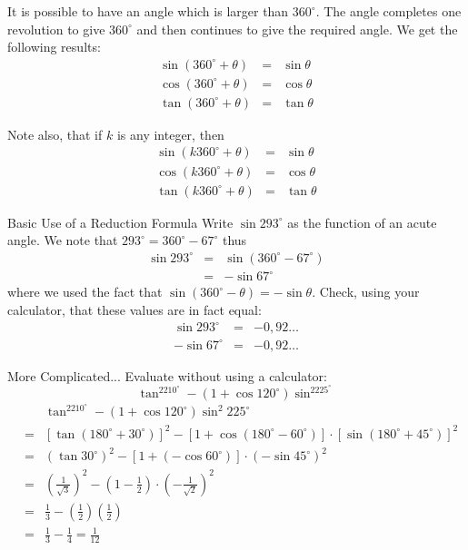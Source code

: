 It is possible to have an angle which is larger than $360^\circ$. The angle completes one revolution to give $360^\circ$ and then continues to give the required angle. We get the following results:
\begin{eqnarray*}
 \sin(360^\circ+\theta) &=& \sin\theta \\
 \cos(360^\circ+\theta) &=& \cos\theta \\
 \tan(360^\circ+\theta) &=& \tan\theta
\end{eqnarray*}

Note also, that if $k$ is any integer, then
\begin{eqnarray*}
 \sin(k360^\circ +\theta) &=& \sin\theta \\
 \cos(k360^\circ +\theta) &=& \cos\theta \\
 \tan(k360^\circ +\theta) &=& \tan\theta
\end{eqnarray*}

\begin{wex}{Basic Use of a Reduction Formula}
{%
Write $\sin 293^\circ$ as the function of an acute angle.
}%
{%
We note that $293^\circ = 360^\circ -67^\circ$ thus
\begin{eqnarray*}
 \sin 293^\circ & = & \sin (360^\circ - 67^\circ)\\
 & =& -\sin 67^\circ 
\end{eqnarray*}
where we used the fact that $ \sin (360^\circ -\theta) = -\sin\theta$. Check, using your calculator, that these values are in fact equal:
\begin{eqnarray*}
\sin 293^\circ &=& -0,92\ldots \\
-\sin 67^\circ &=& -0,92\ldots
\end{eqnarray*}
}%
\end{wex}

\begin{wex}{More Complicated...}
{%
Evaluate without using a calculator: 
\[\tan^2210^\circ-(1+\cos 120^\circ)\sin ^2225^\circ\]
}%
{%
 \begin{eqnarray*}
& & \tan^2210^\circ-(1+\cos 120^\circ)\sin^2 225^\circ\\
&=& [\tan(180^\circ+30^\circ)]^2-[1+\cos(180^\circ-60^\circ)]\cdot[ \sin(180^\circ+45^\circ)]^2\\
&=& (\tan 30^\circ)^2 - [1+(-\cos 60^\circ)] \cdot (-\sin 45^\circ)^2\\
&=& \left( \frac{1}{\sqrt{3}} \right)^2 - \left(1-\frac{1}{2}\right)\cdot \left( -\frac{1}{\sqrt{2}}\right)^2 \\
&=& \frac{1}{3} - \left( \frac{1}{2} \right) \left(\frac{1}{2} \right) \\
&=& \frac{1}{3} - \frac{1}{4} = \frac{1}{12}
\end{eqnarray*}
}%
\end{wex}

